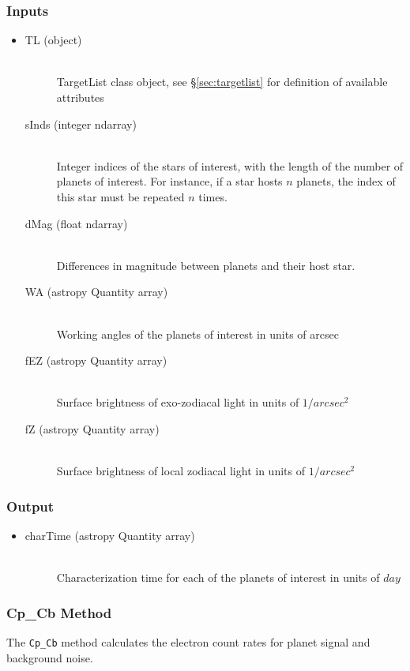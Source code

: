 \documentclass[cleanfoot]{asme2ej}
\begin{document}
\subsubsection*{Inputs}
\begin{itemize}
    \item 
    \begin{description}
        \item[TL (object)] \hfill \\ TargetList class object, see \S\ref{sec:targetlist} for definition of available attributes
        \item[sInds (integer ndarray)] \hfill \\ Integer indices of the stars of interest, with the length of the number of planets of interest. For instance, if a star hosts $ n $ planets, the index of this star must be repeated $ n $ times.
        \item[dMag (float ndarray)] \hfill \\ Differences in magnitude between planets and their host star.
        \item[WA (astropy Quantity array)] \hfill \\ Working angles of the planets of interest in units of arcsec
        \item[fEZ (astropy Quantity array)] \hfill \\ Surface brightness of exo-zodiacal light in units of $ 1/arcsec^2 $
        \item[fZ (astropy Quantity array)] \hfill \\ Surface brightness of local zodiacal light in units of $ 1/arcsec^2 $
    \end{description}
\end{itemize}
\subsubsection*{Output}
\begin{itemize}
    \item 
    \begin{description}
        \item[charTime (astropy Quantity array)] \hfill \\ Characterization time for each of the planets of interest in units of $ day $
    \end{description}
\end{itemize}

\subsubsection{Cp\_Cb Method} \label{sec:CpCbtask}
The \verb+Cp_Cb+ method calculates the electron count rates for planet signal and background noise.
\end{document}
